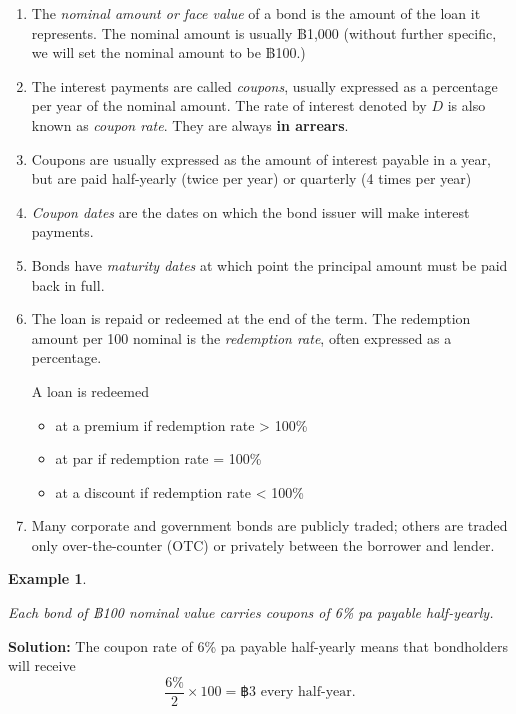 \documentclass[landscape, 20pt]{extreport}
\theoremstyle{definition}
\theoremstyle{definition}
\newtheorem{example}{Example}[chapter]
\theoremstyle{definition}
\theoremstyle{definition}
\theoremstyle{remark}
\begin{document}
\begin{enumerate}
\def\labelenumi{\arabic{enumi}.}
\item
  The \emph{nominal amount or face value} of a bond is the amount of the
  loan it represents. The nominal amount is usually ฿1,000 (without
  further specific, we will set the nominal amount to be ฿100.)
\item
  The interest payments are called \emph{coupons}, usually expressed as a
  percentage per year of the nominal amount. The rate of interest
  denoted by \(D\) is also known as \emph{coupon rate}. They are always \textbf{in
  arrears}.
\item
  Coupons are usually expressed as the amount of interest payable in a
  year, but are paid half-yearly (twice per year) or quarterly (4
  times per year)
\item
  \emph{Coupon dates} are the dates on which the bond issuer will make
  interest payments.
\item
  Bonds have \emph{maturity dates} at which point the principal amount must
  be paid back in full.
\item
  The loan is repaid or redeemed at the end of the term. The
  redemption amount per 100 nominal is the \emph{redemption rate}, often
  expressed as a percentage.

  A loan is redeemed

  \begin{itemize}
  \item
    at a premium if redemption rate \textgreater{} 100\%
  \item
    at par if redemption rate = 100\%
  \item
    at a discount if redemption rate \textless{} 100\%
  \end{itemize}
\item
  Many corporate and government bonds are publicly traded; others are
  traded only over-the-counter (OTC) or privately between the borrower
  and lender.
\end{enumerate}

\newpage \begin{example}
\protect\hypertarget{exm:unlabeled-div-46}{}\label{exm:unlabeled-div-46}

\emph{Each bond of ฿100 nominal value carries coupons of 6\%
pa payable half-yearly.}

\end{example}

\textbf{Solution:} The coupon rate of 6\% pa payable half-yearly means that bondholders will receive
\[ \frac{6\%}{2} \times 100 = ฿ 3 \text{ every half-year}.\]
\end{document}
